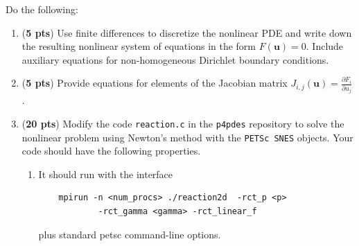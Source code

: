 \documentclass[11pt]{article}
\begin{document}
Do the following:
\begin{enumerate}
  \item (\textbf{5 pts}) Use finite differences to discretize the nonlinear PDE and write down the resulting nonlinear system of equations  in the form $F(\mathbf{u})=0$. Include auxiliary equations for non-homogeneous Dirichlet boundary conditions.
  \item (\textbf{5 pts}) Provide equations for elements of the  Jacobian matrix $J_{i,j}(\mathbf{u})=\frac{\partial F_i}{\partial u_j}$.
  \item (\textbf{20 pts}) Modify the code \texttt{reaction.c} in the \texttt{p4pdes} repository to solve the nonlinear problem using Newton's method with the \texttt{PETSc SNES} objects. Your code should have the following properties.
    \begin{enumerate}
      \item It should run with the interface
    \begin{verbatim}
    mpirun -n <num_procs> ./reaction2d  -rct_p <p>
            -rct_gamma <gamma> -rct_linear_f
    \end{verbatim}
        plus standard petsc command-line options.


\end{enumerate}
\end{enumerate}
\end{document}
